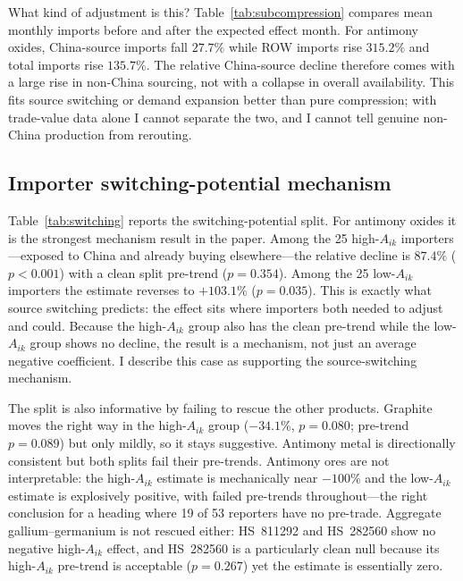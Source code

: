 \documentclass[12pt,a4paper]{article}
\begin{document}


What kind of adjustment is this? Table~\ref{tab:subcompression} compares mean
monthly imports before and after the expected effect month. For antimony oxides,
China-source imports fall $27.7\%$ while ROW imports rise $315.2\%$ and total
imports rise $135.7\%$. The relative China-source decline therefore comes with a
large rise in non-China sourcing, not with a collapse in overall availability.
This fits source switching or demand expansion better than pure compression; with
trade-value data alone I cannot separate the two, and I cannot tell genuine
non-China production from rerouting.



\subsection{Importer switching-potential mechanism}\label{sec:mechanism}

Table~\ref{tab:switching} reports the switching-potential split. For antimony
oxides it is the strongest mechanism result in the paper. Among the 25
high-$A_{ik}$ importers---exposed to China and already buying elsewhere---the
relative decline is $87.4\%$ ($p<0.001$) with a clean split pre-trend ($p=0.354$).
Among the 25 low-$A_{ik}$ importers the estimate reverses to $+103.1\%$
($p=0.035$). This is exactly what source switching predicts: the effect sits
where importers both needed to adjust and could. Because the high-$A_{ik}$ group
also has the clean pre-trend while the low-$A_{ik}$ group shows no decline, the
result is a mechanism, not just an average negative coefficient. I describe this
case as supporting the source-switching mechanism.



The split is also informative by failing to rescue the other products. Graphite
moves the right way in the high-$A_{ik}$ group ($-34.1\%$, $p=0.080$; pre-trend
$p=0.089$) but only mildly, so it stays suggestive. Antimony metal is
directionally consistent but both splits fail their pre-trends. Antimony ores are
not interpretable: the high-$A_{ik}$ estimate is mechanically near $-100\%$ and
the low-$A_{ik}$ estimate is explosively positive, with failed pre-trends
throughout---the right conclusion for a heading where 19 of 53 reporters have no
pre-trade. Aggregate gallium--germanium is not rescued either: HS~811292 and
HS~282560 show no negative high-$A_{ik}$ effect, and HS~282560 is a particularly
clean null because its high-$A_{ik}$ pre-trend is acceptable ($p=0.267$) yet the
estimate is essentially zero.
\end{document}
